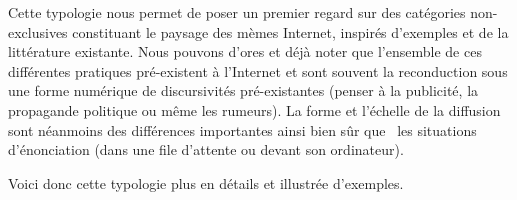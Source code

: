 Cette typologie nous permet de poser un premier regard sur des cat\'egories non-exclusives constituant le paysage des m\`emes Internet, inspir\'es d{\textquoteright}exemples et de la litt\'erature existante. Nous pouvons d{\textquoteright}ores et d\'ej\`a noter que l{\textquoteright}ensemble de ces diff\'erentes pratiques pr\'e-existent \`a l{\textquoteright}Internet et sont souvent la reconduction sous une forme num\'erique de discursivit\'es pr\'e-existantes (penser \`a la publicit\'e, la propagande politique ou m\^eme les rumeurs). La forme et l{\textquoteright}\'echelle de la diffusion sont n\'eanmoins des diff\'erences importantes ainsi bien s\^ur que \ les situations d{\textquoteright}\'enonciation (dans une file d{\textquoteright}attente ou devant son ordinateur). 

Voici donc cette typologie plus en d\'etails et illustr\'ee d{\textquoteright}exemples. 


